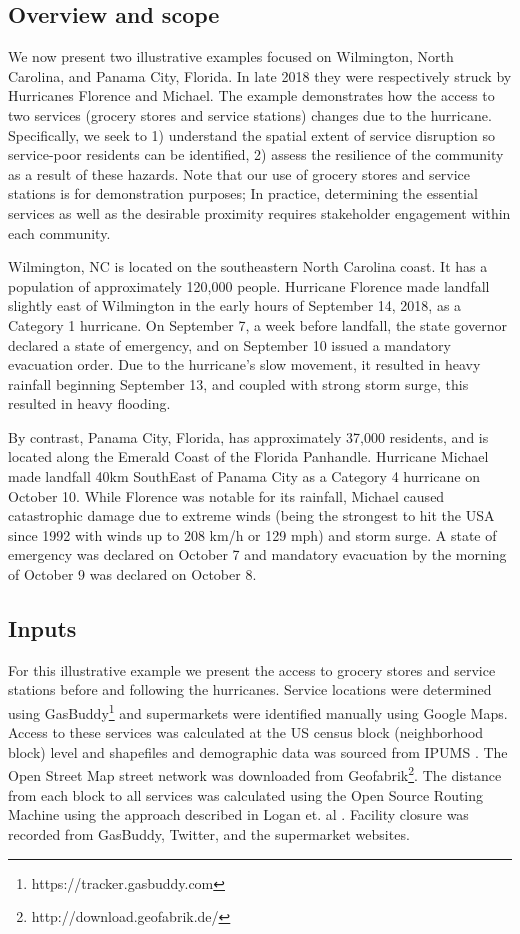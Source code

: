 \documentclass[9pt,twocolumn,twoside,lineno]{pnas-new}
\begin{document}
\subsection*{Overview and scope}
We now present two illustrative examples focused on Wilmington, North Carolina, and Panama City, Florida.
In late 2018 they were respectively struck by Hurricanes Florence and Michael. 
The example demonstrates how the access to two services (grocery stores and service stations) changes due to the hurricane. 
Specifically, we seek to 1) understand the spatial extent of service disruption so service-poor residents can be identified, 2) assess the resilience of the community as a result of these hazards. 
Note that our use of grocery stores and service stations is for demonstration purposes; In practice, determining the essential services as well as the desirable proximity requires stakeholder engagement within each community. 

Wilmington, NC is located on the southeastern North Carolina coast.
It has a population of approximately 120,000 people. 
Hurricane Florence made landfall slightly east of Wilmington in the early hours of September 14, 2018, as a Category 1 hurricane. 
On September 7, a week before landfall, the state governor declared a state of emergency, and on September 10 issued a mandatory evacuation order. 
Due to the hurricane’s slow movement, it resulted in heavy rainfall beginning September 13, and coupled with strong storm surge, this resulted in heavy flooding. 

By contrast, Panama City, Florida, has approximately 37,000 residents, and is located along the Emerald Coast of the Florida Panhandle. 
Hurricane Michael made landfall 40km SouthEast of Panama City as a Category 4 hurricane on October 10. 
While Florence was notable for its rainfall, 
Michael caused catastrophic damage due to extreme winds (being the strongest to hit the USA since 1992 with winds up to 208 km/h or 129 mph) and storm surge. 
A state of emergency was declared on October 7 and mandatory evacuation by the morning of October 9 was declared on October 8.

\subsection*{Inputs}
For this illustrative example we present the access to grocery stores and service stations before and following the hurricanes. 
Service locations were determined using GasBuddy\footnote{https://tracker.gasbuddy.com} and supermarkets were identified manually using Google Maps.
Access to these services was calculated at the US census block (neighborhood block) level and shapefiles and demographic data was sourced from IPUMS \cite{Manson2018-ug}. 
The Open Street Map street network was downloaded from Geofabrik\footnote{http://download.geofabrik.de/}. 
The distance from each block to all services was calculated using the Open Source Routing Machine using the approach described in Logan et. al \cite{Logan2017-fr}. 
Facility closure was recorded from GasBuddy, Twitter, and the supermarket websites.
\end{document}
